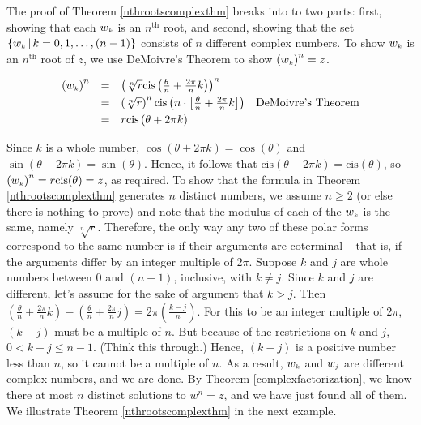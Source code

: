 The proof of Theorem \ref{nthrootscomplexthm} breaks into to two parts:  first, showing that each $w_{\text{\tiny$k$}}$ is an $n^{\text{th}}$ root, and second, showing that the set  $\left\{ w_{\text{\tiny$k$}} \, | \, k = 0, 1, \ldots, (n-1)\right\}$ consists of $n$ different  complex numbers.  To show $w_{\text{\tiny$k$}}$ is an  $n^{\text{th}}$ root of $z$, we use DeMoivre's Theorem to show $\left(w_{\text{\tiny$k$}}\right)^n = z$.

\[ \begin{array}{rcll}

\left(w_{\text{\tiny$k$}}\right)^n & = & \left(\sqrt[n]{r}\text{cis}\left(\frac{\theta}{n} + \frac{2\pi}{n} k \right)\right)^n & \\ [3pt]
																	 & = & \left(\sqrt[n]{r}\right)^{n} \text{cis}\left( n \cdot \left[\frac{\theta}{n} + \frac{2\pi}{n} k \right] \right) & \text{DeMoivre's Theorem}\\ [3pt]
																	 & = & r \text{cis}\left(\theta + 2\pi k\right) & \\ \end{array} \]
																	 
Since $k$ is a whole number, $\cos(\theta + 2\pi k) = \cos(\theta)$ and $\sin(\theta + 2\pi k) = \sin(\theta)$. Hence, it follows that $\text{cis}(\theta + 2\pi k) = \text{cis}(\theta)$, so $\left(w_{\text{\tiny$k$}}\right)^n = r \text{cis}(\theta) = z$, as required.  To show that the formula in Theorem  \ref{nthrootscomplexthm} generates $n$ distinct numbers, we assume $n \geq 2$ (or else there is nothing to prove) and note that the modulus of each of the  $w_{\text{\tiny$k$}}$  is the same, namely $\sqrt[n]{r}$.  Therefore, the only way any two of these polar forms correspond to  the same number is if their arguments are coterminal -- that is, if the arguments differ by an integer multiple of $2\pi$. Suppose $k$ and $j$ are whole numbers between $0$ and $(n-1)$, inclusive,  with $k \neq j$.  Since $k$ and $j$ are different, let's assume for the sake of argument that  $k > j$.  Then $\left( \frac{\theta}{n} + \frac{2\pi}{n} k \right)  - \left( \frac{\theta}{n} + \frac{2\pi}{n} j \right) = 2\pi \left(\frac{k-j}{n}\right)$. For this to be an integer multiple of $2\pi$, $(k-j)$ must be a multiple of $n$.  But because of the restrictions on $k$ and $j$, $0 < k - j \leq n-1$. (Think this through.)  Hence, $(k-j)$ is a positive number less  than $n$, so it cannot be a multiple of $n$.  As a result, $w_{\text{\tiny$k$}}$ and $w_{\text{\tiny$j$}}$ are different complex numbers, and we are done.  By Theorem  \ref{complexfactorization}, we know there at most $n$ distinct solutions to $w^{n} = z$, and we have just found all of them.   We illustrate Theorem \ref{nthrootscomplexthm} in the next example.

